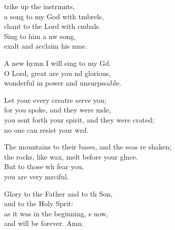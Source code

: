 \settowidth{\versewidth}{The mountains to their bases, and the seas are shaken; *}
\begin{psalmverse}%
  \begin{patverse}
    trike up the instrmnts,\Flex\\
a song to my God with t\pointup{\i}mbrels,\Med\\
chant to the Lord with cmbals.\\
Sing to him a nw song,\Med\\
exalt and acclaim his nme.

A new hymn I will sing to my Gd.\Flex\\
O Lord, great are you nd glorious,\Med\\
wonderful in power and unsurpssable.

Let your every creatre serve you;\Med\\
for you spoke, and they were mde,\\
you sent forth your spirit, and they were crated;\Med\\
no one can resist your wrd.

The mountains to their bases, and the seas re shaken;\Med\\
the rocks, like wax, melt before your glnce.\\
But to those wh fear you,\Med\\
you are very mrciful.

Glory to the Father and to th Son,\Med\\
and to the Holy Sp\pointup{\i}rit:\\
as it was in the beginning, \pointup{\i}s now,\Med\\
and will be forever. Amn. 
  \end{patverse}
\end{psalmverse}

